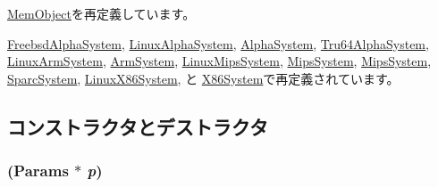 \hyperlink{classMemObject_a905bbc621eeec0ed08859e21c8c95412}{MemObject}を再定義しています。

\hyperlink{classFreebsdAlphaSystem_a0cee38b7e957f9f434ee078d80b94d1b}{FreebsdAlphaSystem}, \hyperlink{classLinuxAlphaSystem_a0d8e2379ed014b6039c45eb98c24fed4}{LinuxAlphaSystem}, \hyperlink{classAlphaSystem_a2af24d7a564ee2ca81332fb46406cbe5}{AlphaSystem}, \hyperlink{classTru64AlphaSystem_a653e3d38e55079cc093cc4945c1ac3d1}{Tru64AlphaSystem}, \hyperlink{classLinuxArmSystem_ae0ebf28024a7bb607cc65e59c8faa9d5}{LinuxArmSystem}, \hyperlink{classArmSystem_a8ae84e66b34bac08937a6bad4412ba5d}{ArmSystem}, \hyperlink{classLinuxMipsSystem_a3d1083cbefc15728ca643470f9efbf13}{LinuxMipsSystem}, \hyperlink{classMipsSystem_acf01be080284e8262bc1ff41fbd1710c}{MipsSystem}, \hyperlink{classMipsSystem_acf01be080284e8262bc1ff41fbd1710c}{MipsSystem}, \hyperlink{classSparcSystem_ad1d7d4179ae16224e8ae3360e3e676b8}{SparcSystem}, \hyperlink{classLinuxX86System_a9a9d4fd080ddd5d649f7db5e47cfae8b}{LinuxX86System}, と \hyperlink{classX86System_a4f3142e3ba81ac1e14e960636ad3202b}{X86System}で再定義されています。

\subsection{コンストラクタとデストラクタ}
\hypertarget{classSystem_a0b8704078300e9b3cd65559df0ac79ab}{
\subsubsection[{System}]{ ({\bf Params} $\ast$ {\em p})}}
\label{classSystem_a0b8704078300e9b3cd65559df0ac79ab}



